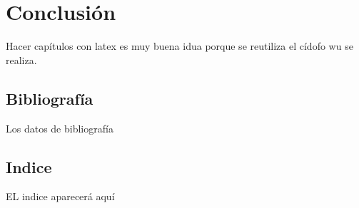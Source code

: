 \chapter{Conclusión}
  Hacer capítulos con latex es muy buena idua porque se reutiliza el cídofo wu se realiza.
  \section{Bibliografía}
    Los datos de bibliografía
  \section{Indice}
    EL indice aparecerá aquí    
  
  